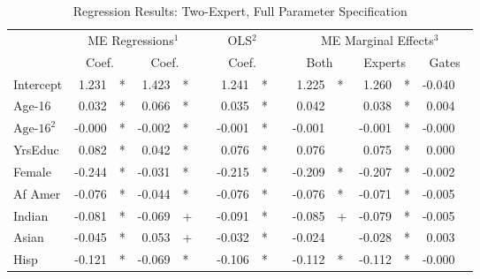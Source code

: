 \documentclass[12pt]{article}
\theoremstyle{definition}
\begin{document}
\begin{landscape}
\begin{table} \centering
  \caption{Regression Results: Two-Expert, Full Parameter Specification}
    \begin{threeparttable}
      \begin{tabular}[l]{l r l r l c r l c r l r l r l}

\cmidrule{1-15}
& \multicolumn{4}{c}{ME Regressions$^{1}$} &&  \multicolumn{2}{c}{OLS$^{2}$} && \multicolumn{6}{c}{ME Marginal Effects$^{3}$} \\
\cmidrule(l){2-5}    \cmidrule(l){7-8}     \cmidrule(l){10-15}
& \multicolumn{2}{c}{Coef.} &  \multicolumn{2}{c}{Coef.}  && \multicolumn{2}{c}{Coef.} && \multicolumn{2}{c}{Both}    &  \multicolumn{2}{c}{Experts}  &  \multicolumn{2}{c}{Gates} \\
                \cmidrule(l){2-3} \cmidrule(l){4-5} \cmidrule(l){7-8} \cmidrule(l){10-11} \cmidrule(l){12-13} \cmidrule(l){14-15}
Intercept              &  1.231 & *      &  1.423 & *     &&  1.241 & *     &&  1.225 & *        &  1.260 & *        & -0.040 &        \\
Age-16                 &  0.032 & *      &  0.066 & *     &&  0.035 & *     &&  0.042 &          &  0.038 & *        &  0.004 &        \\
$\textrm{Age-16}^{2}$  & -0.000 & *      & -0.002 & *     && -0.001 & *     && -0.001 &          & -0.001 & *        & -0.000 &        \\
YrsEduc                &  0.082 & *      &  0.042 & *     &&  0.076 & *     &&  0.076 &          &  0.075 & *        &  0.000 &        \\
Female                 & -0.244 & *      & -0.031 & *     && -0.215 & *     && -0.209 & *        & -0.207 & *        & -0.002 &        \\
Af Amer                & -0.076 & *      & -0.044 & *     && -0.076 & *     && -0.076 & *        & -0.071 & *        & -0.005 &        \\
Indian                 & -0.081 & *      & -0.069 & +     && -0.091 & *     && -0.085 & +        & -0.079 & *        & -0.005 &        \\
Asian                  & -0.045 & *      &  0.053 & +     && -0.032 & *     && -0.024 &          & -0.028 & *        &  0.003 &        \\
Hisp                   & -0.121 & *      & -0.069 & *     && -0.106 & *     && -0.112 & *        & -0.112 & *        & -0.000 &        \\

\end{tabular}
\end{threeparttable}
\end{table}
\end{landscape}
\end{document}
